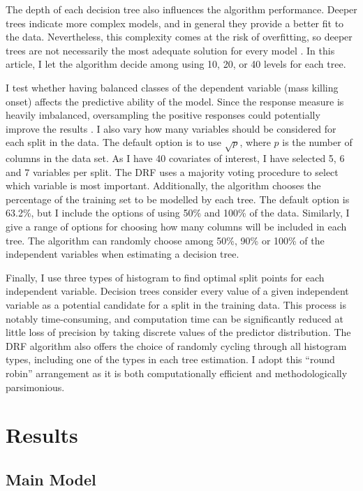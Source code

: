 \documentclass[a4paper,12pt]{article}
\begin{document}
The depth of each decision tree also influences the algorithm performance. Deeper trees indicate more complex models, and in general they provide a better fit to the data. Nevertheless, this complexity comes at the risk of overfitting, so deeper trees are not necessarily the most adequate solution for every model \citep[596]{friedman2001greedy,segal2004machine}. In this article, I let the algorithm decide among using 10, 20, or 40 levels for each tree. 
	
I test whether having balanced classes of the dependent variable (mass killing onset) affects the predictive ability of the model. Since the response measure is heavily imbalanced, oversampling the positive responses could potentially improve the results \citep{chawla2004special,del2014use,japkowicz2002class}. 
I also vary how many variables should be considered for each split in the data. The default option is to use $\sqrt{p}$, where $p$ is the number of columns in the data set. As I have 40 covariates of interest, I have selected 5, 6 and 7 variables per split. The DRF uses a majority voting procedure to select which variable is most important. Additionally, the algorithm chooses the percentage of the training set to be modelled by each tree. The default option is 63.2\%, but I include the options of using 50\% and 100\% of the data. Similarly, I give a range of options for choosing how many columns will be included in each tree. The algorithm can randomly choose among 50\%, 90\% or 100\% of the independent variables when estimating a decision tree.

Finally, I use three types of histogram to find optimal split points for each independent variable. Decision trees consider every value of a given independent variable as a potential candidate for a split in the training data. This process is notably time-consuming, and computation time can be significantly reduced at little loss of precision by taking discrete values of the predictor distribution. The DRF algorithm also offers the choice of randomly cycling through all histogram types, including one of the types in each tree estimation. I adopt this ``round robin'' arrangement as it is both computationally efficient and methodologically parsimonious.
	
\section{Results}
\label{sec:results}

\subsection{Main Model}%
\label{sub:main_model}
	
\end{document}
